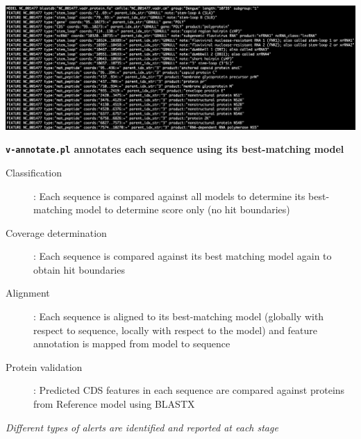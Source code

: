 \documentclass[landscape]{slides}
\begin{document}
\begin{slide}
\begin{center}

\includegraphics[width=9in]{figs/ss-001477-minfo}

\end{center}
\end{slide}
\begin{slide}
\begin{center}
\textbf{\texttt{v-annotate.pl} annotates each sequence using its
  best-matching model}

\small
\begin{description}
\item[Classification]: Each sequence is compared against all models 
  to determine its best-matching model to determine score only (no
  hit boundaries)

\item[Coverage determination]: Each sequence is compared against
  its best matching model again to obtain hit boundaries

\item[Alignment]: Each sequence is aligned to its best-matching
  model (globally with respect to sequence, locally with respect to
  the model) and feature annotation is mapped from model to sequence

\item[Protein validation]: Predicted CDS features in each sequence are
  compared against proteins from Reference model using BLASTX
\end{description}

\emph{Different types of alerts are identified and reported at each stage}

\end{center}

\vfill
\end{slide}
\end{document}
